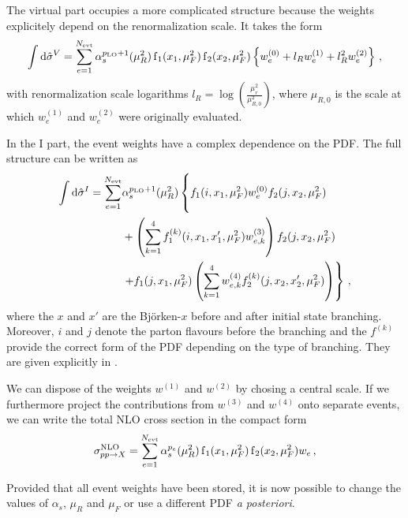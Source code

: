 The virtual part occupies a more complicated structure because the weights explicitely depend on the renormalization scale.
It takes the form
%
\begin{equation}
	\int \dif \hat \sigma^V = \sum_{e=1}^{N_\text{evt}} \alpha_s^{p_\text{LO} + 1}(\mu_R^2) \pdf_1(x_1,\mu_F^2) \pdf_2(x_2,\mu_F^2) \left\{ w_e^{(0)} + l_R w_e^{(1)} + l_R^2 w_e^{(2)} \right\} \, ,
\end{equation}
%
with renormalization scale logarithms $l_R = \log\left(\frac{\mu_r^2}{\mu_{R,0}^2} \right)$, where $\mu_{R,0}$ is the scale at which $w_e^{(1)}$ and $w_e^{(2)}$ were originally evaluated.

In the I part, the event weights have a complex dependence on the PDF.
The full structure can be written as
%
\begin{align}
	\int \dif \hat \sigma^I = \sum_{e=1}^{N_\text{evt}} &\alpha_s^{p_\text{LO} + 1}(\mu_R^2) \left\{ \vphantom{\left( \sum_{k=1}^4 \right)} f_1(i,x_1,\mu_F^2) w_e^{(0)} f_2(j,x_2,\mu_F^2) \right. \nonumber \\
								&+ \left( \sum_{k=1}^4 f_1^{(k)}(i,x_1,x'_1,\mu_F^2) w_{e,k}^{(3)} \right) f_2(j,x_2,\mu_F^2) \nonumber \\
								&\left. + f_1(j,x_1,\mu_F^2) \left( \sum_{k=1}^4 w_{e,k}^{(4)} f_2^{(k)}(j,x_2,x'_2,\mu_F^2) \right) \right\} \, ,
\end{align}
%
where the $x$ and $x'$ are the Björken-$x$ before and after initial state branching.
Moreover, $i$ and $j$ denote the parton flavours before the branching and the $f^{(k)}$ provide the correct form of the PDF depending on the type of branching.
They are given explicitly in \cite{mcgrid2013}.

We can dispose of the weights $w^{(1)}$ and $w^{(2)}$ by chosing a central scale.
If we furthermore project the contributions from $w^{(3)}$ and $w^{(4)}$ onto separate events, we can write the total NLO cross section in the compact form
%
\begin{equation}
  \sigma^\text{NLO}_{pp \rightarrow X} = \sum_{e=1}^{N_\text{evt}} \alpha_s^{p_e}(\mu_R^2) \operatorname{f}_1(x_1,\mu_F^2) \operatorname{f}_2(x_2,\mu_F^2) w_e \, ,
  \label{eq:reweight_nlo}
\end{equation}
%

Provided that all event weights have been stored, it is now possible to change the values of $\alpha_s$, $\mu_R$ and $\mu_F$ or use a different PDF \textit{a posteriori}.
%
